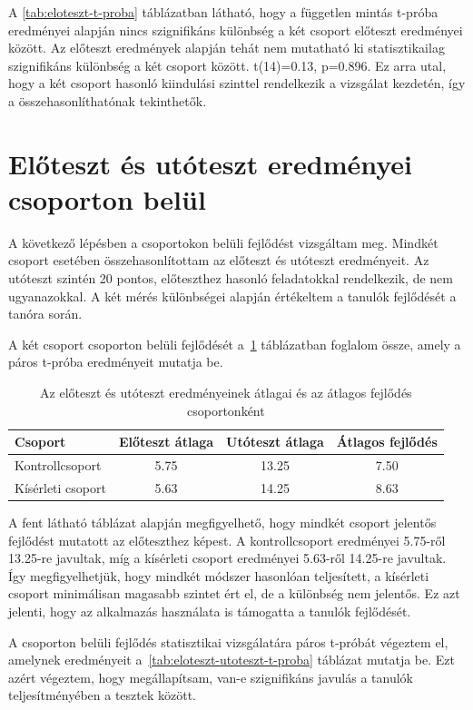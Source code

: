 A \ref{tab:eloteszt-t-proba} táblázatban látható, hogy a független mintás t-próba eredményei alapján nincs szignifikáns különbség a két csoport előteszt eredményei között. Az előteszt eredmények alapján tehát nem mutatható ki statisztikailag szignifikáns különbség a két csoport között. t(14)=0.13, p=0.896. Ez arra utal, hogy a két csoport hasonló kiindulási szinttel rendelkezik a vizsgálat kezdetén, így a összehasonlíthatónak tekinthetők.

\section{Előteszt és utóteszt eredményei csoporton belül}

A következő lépésben a csoportokon belüli fejlődést vizsgáltam meg. Mindkét csoport esetében összehasonlítottam az előteszt és utóteszt eredményeit. Az utóteszt szintén 20 pontos, előteszthez hasonló feladatokkal rendelkezik, de nem ugyanazokkal. A két mérés különbségei alapján értékeltem a tanulók fejlődését a tanóra során.

A két csoport csoporton belüli fejlődését a~\ref{tab:eloteszt-utoteszt-fejlodes} táblázatban foglalom össze, amely a páros t-próba eredményeit mutatja be.

\begin{table}[h!]
\centering
\begin{tabular}{lccc}
\hline
\textbf{Csoport} & \textbf{Előteszt átlaga} & \textbf{Utóteszt átlaga} & \textbf{Átlagos fejlődés} \\
\hline
Kontrollcsoport & 5.75 & 13.25 & 7.50 \\
Kísérleti csoport & 5.63 & 14.25 & 8.63 \\
\hline
\end{tabular}
\caption{Az előteszt és utóteszt eredményeinek átlagai és az átlagos fejlődés csoportonként}
\label{tab:eloteszt-utoteszt-fejlodes}
\end{table}

A fent látható táblázat alapján megfigyelhető, hogy mindkét csoport jelentős fejlődést mutatott az előteszthez képest. A kontrollcsoport eredményei 5.75-ről 13.25-re javultak, míg a kísérleti csoport eredményei 5.63-ről 14.25-re javultak. Így megfigyelhetjük, hogy mindkét módszer hasonlóan teljesített, a kísérleti csoport minimálisan magasabb szintet ért el, de a különbség nem jelentős. Ez azt jelenti, hogy az alkalmazás használata is támogatta a tanulók fejlődését.

A csoporton belüli fejlődés statisztikai vizsgálatára páros t-próbát végeztem el, amelynek eredményeit a~\ref{tab:eloteszt-utoteszt-t-proba} táblázat mutatja be. Ezt azért végeztem, hogy megállapítsam, van-e szignifikáns javulás a tanulók teljesítményében a tesztek között.

